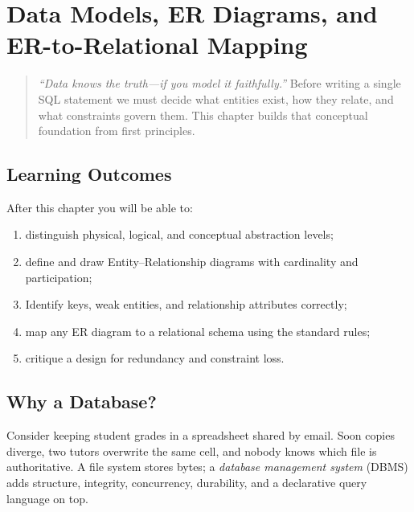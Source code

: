 \chapter{Data Models, ER Diagrams, and ER-to-Relational Mapping}
\label{ch:models}

\begin{quote}
\emph{``Data knows the truth---if you model it faithfully.''} Before writing a single SQL statement we must decide what entities exist, how they relate, and what constraints govern them. This chapter builds that conceptual foundation from first principles.
\end{quote}

\noindent{}
\vspace{0.4em}

\section*{Learning Outcomes}
After this chapter you will be able to:
\begin{enumerate}[label=(L\arabic*)]
    \item distinguish physical, logical, and conceptual abstraction levels;
    \item define and draw Entity--Relationship diagrams with cardinality and participation;
    \item Identify keys, weak entities, and relationship attributes correctly;
    \item map any ER diagram to a relational schema using the standard rules;
    \item critique a design for redundancy and constraint loss.
\end{enumerate}

\section{Why a Database?}
\label{sec:why-db}

Consider keeping student grades in a spreadsheet shared by email. Soon copies diverge, two tutors overwrite the same cell, and nobody knows which file is authoritative. A file system stores bytes; a \emph{database management system} (DBMS) adds structure, integrity, concurrency, durability, and a declarative query language on top.


